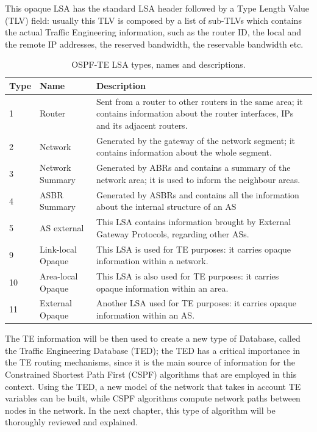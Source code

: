 \documentclass[10pt,a4paper]{report}
\begin{document}
\newpage

This opaque LSA has the standard LSA header followed by a Type Length
Value (TLV) field: usually this TLV is composed by a list of sub-TLVs
which contains the actual Traffic Engineering information, such as the
router ID, the local and the remote IP addresses, the reserved
bandwidth, the reservable bandwidth etc.

\begin{table}[!tbp]
  \begin{center}
    \begin{tabular}{|l|l|p{}|}
      \hline
      Type& Name & Description \\ \hline
      1 &  Router & Sent from a router to other routers in the same
      area; it contains information about the router interfaces, IPs
      and its adjacent routers. \\
      2 & Network & Generated by the gateway of the network segment;
      it contains information about the whole segment. \\
      3 & Network Summary & Generated by ABRs and contains a summary
      of the network area; it is used to inform the neighbour areas. \\
      4 & ASBR Summary &  Generated by ASBRs and contains all the
      information about the internal structure of an AS \\
      5 & AS external &  This LSA contains information brought by
      External Gateway Protocols, regarding other ASs. \\
      9 & Link-local Opaque & This LSA is used for TE purposes: it
      carries opaque information within a network. \\
      10 & Area-local Opaque & This LSA is also used for TE purposes:
      it carries opaque information within an area. \\
      11 & External Opaque & Another LSA used for TE purposes: it
      carries opaque information within an AS. \\
      \hline
    \end{tabular}
    \caption[OSPF-TE LSA types]{OSPF-TE LSA types, names and
      descriptions.}
    \label{tab:ospf_lsa}
  \end{center}
\end{table}

The TE information will be then used to create a new type of Database,
called the Traffic Engineering Database (TED); the TED has a critical
importance in the TE routing mechanisms, since it is the main source
of information for the Constrained Shortest Path First (CSPF)
algorithms that are employed in this context. Using the TED, a new
model of the network that takes in account TE variables can be built,
while CSPF algorithms compute network paths between nodes in the
network. In the next chapter, this type of algorithm will be
thoroughly reviewed and explained.
\end{document}
